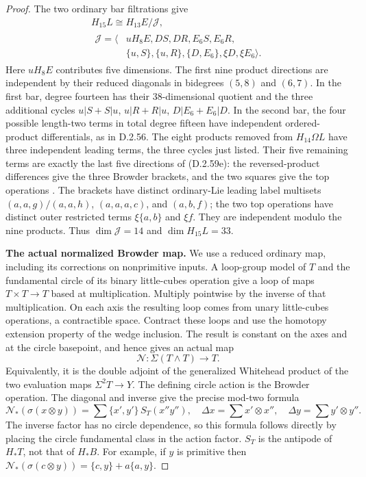 \begin{proof}
The two ordinary bar filtrations give
\[
 \begin{gathered}
 H_{15}L\cong H_{13}E/\mathcal J,\\
 \begin{split}
 \mathcal J=\langle{}&uH_8E,DS,DR,E_6S,E_6R,\\
       &\{u,S\},\{u,R\},\{D,E_6\},\xi D,\xi E_6\rangle .
 \end{split}
 \end{gathered}
 \tag{D.2.59e}
\]
Here $uH_8E$ contributes five dimensions.  The first nine product
directions are independent by their reduced diagonals in
bidegrees $(5,8)$ and $(6,7)$.  In the first bar, degree fourteen
has their $38$-dimensional quotient and the three additional
cycles $u|S+S|u$, $u|R+R|u$, $D|E_6+E_6|D$.
In the second bar, the four possible length-two terms in total
degree fifteen have independent ordered-product differentials,
as in D.2.56.  The eight products removed from $H_{14}\Omega L$
have three independent leading terms, the three cycles just listed.
Their five remaining terms are exactly the last five directions
of \textup{(D.2.59e)}: the reversed-product differences give the
three Browder brackets, and the two squares give the top
operations \cite[III, Theorem 1.4]{I_CohenLadaMay1976}.
The brackets have distinct ordinary-Lie leading label multisets
$(a,a,g)/(a,a,h)$, $(a,a,a,c)$, and $(a,b,f)$; the two top
operations have distinct outer restricted terms $\xi\{a,b\}$
and $\xi f$.  They are independent modulo the nine products.
Thus $\dim\mathcal J=14$ and $\dim H_{15}L=33$.

\textbf{The actual normalized Browder map.}
We use a reduced ordinary map, including its corrections on
nonprimitive inputs.  A loop-group model of $T$ and the fundamental
circle of its binary little-cubes operation give a loop of maps
$T\times T\to T$ based at multiplication.  Multiply pointwise
by the inverse of that multiplication.  On each axis the resulting
loop comes from unary little-cubes operations, a contractible
space.  Contract these loops and use the homotopy extension
property of the wedge inclusion.  The result is constant on the
axes and at the circle basepoint, and hence gives an actual map
\[
 \mathcal N:\Sigma(T\wedge T)\longrightarrow T.
 \tag{D.2.59f}
\]
Equivalently, it is the double adjoint of the generalized Whitehead
product of the two evaluation maps $\Sigma^2T\to Y$.
The defining circle action is the Browder operation.  The diagonal
and inverse give the precise mod-two formula
\[
 \mathcal N_*(\sigma(x\otimes y))
   =\sum\{x',y'\}\,S_T(x''y''),
 \quad
 \Delta x=\sum x'\otimes x'',\quad
 \Delta y=\sum y'\otimes y''.
 \tag{D.2.59g}
\]
The inverse factor has no circle dependence, so this formula
follows directly by placing the circle fundamental class in the
action factor.  $S_T$ is the antipode of $H_*T$, not that of
$H_*B$.  For example, if $y$ is primitive then
$\mathcal N_*(\sigma(c\otimes y))=\{c,y\}+a\{a,y\}$.


\end{proof}
